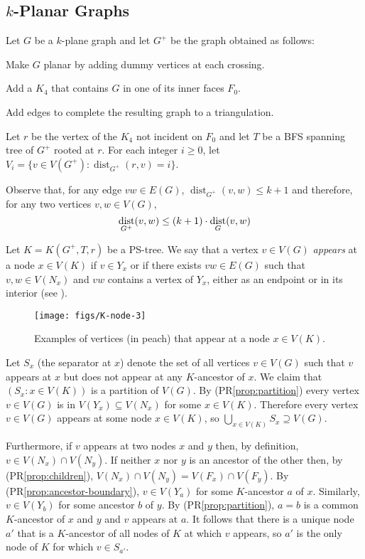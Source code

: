 \documentclass{patmorin}
\DeclareMathOperator{\dist}{dist}
\renewcommand{\propref}[1]{(PR\ref{prop:#1})}
\begin{document}
\subsection{$k$-Planar Graphs}

Let $G$ be a $k$-plane graph and let $G^+$ be the graph obtained as follows:
\begin{compactenum}
  \item Make $G$ planar by adding dummy vertices at each crossing.
  \item Add a $K_4$ that contains $G$ in one of its inner faces $F_0$.
  \item Add edges to complete the resulting graph to a triangulation.
\end{compactenum}
Let $r$ be the vertex of the $K_4$ not incident on $F_0$ and let $T$ be a BFS spanning tree of $G^+$ rooted at $r$.  For each integer $i\ge 0$, let $V_i=\{v\in V(G^+): \dist_{G^+}(r,v)=i\}$.

Observe that, for any edge $vw\in E(G)$, $\dist_{G^+}(v,w) \le k+1$ and therefore, for any two vertices $v,w\in V(G)$,
\begin{equation} 
  \dist_{G^+}(v,w) \le (k+1)\cdot \dist_G(v,w) \eqlabel{distance-preserving}
\end{equation}

Let $K=K(G^+,T,r)$ be a PS-tree.  We say that a vertex $v\in V(G)$ \emph{appears} at a node $x\in V(K)$ if $v\in Y_x$ or if there exists $vw\in E(G)$ such that $v,w\in V(N_x)$ and $vw$ contains a vertex of $Y_x$, either as an endpoint or in its interior (see ).

\begin{figure}
  \begin{center}
    \texttt{[image: figs/K-node-3]}
  \end{center}
  \caption{Examples of vertices (in peach) that appear at a node $x\in V(K)$.}
\end{figure}

Let $S_x$ (the separator at $x$) denote the set of all vertices $v\in V(G)$ such that $v$ appears at $x$ but does not appear at any $K$-ancestor of $x$.  We claim that $(S_x:x\in V(K))$ is a partition of $V(G)$. By \propref{partition} every vertex $v\in  V(G)$ is in $V(Y_x)\subseteq V(N_x)$ for some $x\in V(K)$. Therefore every vertex $v\in V(G)$ appears at some node $x\in V(K)$, so $\bigcup_{x\in V(K)} S_x \supseteq V(G)$.

Furthermore, if $v$ appears at two nodes $x$ and $y$ then, by definition, $v\in V(N_x)\cap V(N_y)$. If neither $x$ nor $y$ is an ancestor of the other then, by \propref{children}, $V(N_x)\cap V(N_y)=V(F_x)\cap V(F_y)$.  By \propref{ancestor-boundary}, $v\in V(Y_a)$ for some $K$-ancestor $a$ of $x$.  Similarly, $v\in V(Y_{b})$ for some ancestor $b$ of $y$.  By \propref{partition}, $a=b$ is a common $K$-ancestor of $x$ and $y$ and $v$ appears at $a$.  It follows that there is a unique node $a'$ that is a $K$-ancestor of all nodes of $K$ at which $v$ appears, so $a'$ is the only node of $K$ for which $v\in S_{a'}$.
\end{document}
